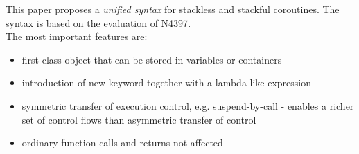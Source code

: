 This paper proposes a \emph{unified syntax} for stackless and stackful
coroutines. The syntax is based on the evaluation of N4397\cite{N4397}.\\
\newline
The most important features are:
\begin{itemize}
    \item first-class object that can be stored in variables or containers
    \item introduction of new keyword \resumable together with a lambda-like
          expression
    \item symmetric transfer of execution control, e.g. suspend-by-call -
          enables a richer set of control flows than asymmetric transfer of
          control
    \item ordinary function calls and returns not affected
\end{itemize}
